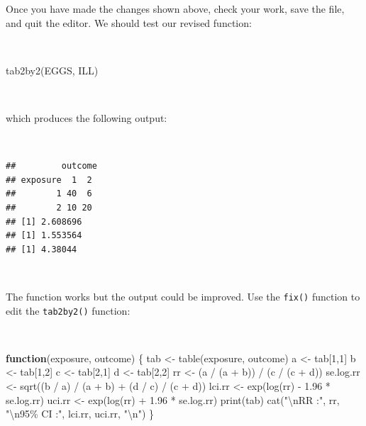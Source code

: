 \documentclass[
  12pt,
]{book}
\newenvironment{Shaded}{\begin{snugshade}}{\end{snugshade}}
\newcommand{\ControlFlowTok}[1]{\textcolor[rgb]{0.13,0.29,0.53}{\textbf{#1}}}
\newcommand{\DecValTok}[1]{\textcolor[rgb]{0.00,0.00,0.81}{#1}}
\newcommand{\FloatTok}[1]{\textcolor[rgb]{0.00,0.00,0.81}{#1}}
\newcommand{\FunctionTok}[1]{\textcolor[rgb]{0.00,0.00,0.00}{#1}}
\newcommand{\NormalTok}[1]{#1}
\newcommand{\OtherTok}[1]{\textcolor[rgb]{0.56,0.35,0.01}{#1}}
\newcommand{\SpecialCharTok}[1]{\textcolor[rgb]{0.00,0.00,0.00}{#1}}
\newcommand{\StringTok}[1]{\textcolor[rgb]{0.31,0.60,0.02}{#1}}
\begin{document}
Once you have made the changes shown above, check your work, save the file, and quit the editor. We should test our revised function:

~

\begin{Shaded}
\begin{Highlighting}[]
\FunctionTok{tab2by2}\NormalTok{(EGGS, ILL)}
\end{Highlighting}
\end{Shaded}

~

which produces the following output:

~

\begin{verbatim}
##         outcome
## exposure  1  2
##        1 40  6
##        2 10 20
## [1] 2.608696
## [1] 1.553564
## [1] 4.38044
\end{verbatim}

~

The function works but the output could be improved. Use the \texttt{fix()} function to edit the \texttt{tab2by2()} function:

~

\begin{Shaded}
\begin{Highlighting}[]
\ControlFlowTok{function}\NormalTok{(exposure, outcome) \{}
\NormalTok{  tab }\OtherTok{\textless{}{-}} \FunctionTok{table}\NormalTok{(exposure, outcome)}
\NormalTok{  a }\OtherTok{\textless{}{-}}\NormalTok{ tab[}\DecValTok{1}\NormalTok{,}\DecValTok{1}\NormalTok{]}
\NormalTok{  b }\OtherTok{\textless{}{-}}\NormalTok{ tab[}\DecValTok{1}\NormalTok{,}\DecValTok{2}\NormalTok{]}
\NormalTok{  c }\OtherTok{\textless{}{-}}\NormalTok{ tab[}\DecValTok{2}\NormalTok{,}\DecValTok{1}\NormalTok{]}
\NormalTok{  d }\OtherTok{\textless{}{-}}\NormalTok{ tab[}\DecValTok{2}\NormalTok{,}\DecValTok{2}\NormalTok{]}
\NormalTok{  rr }\OtherTok{\textless{}{-}}\NormalTok{ (a }\SpecialCharTok{/}\NormalTok{ (a }\SpecialCharTok{+}\NormalTok{ b)) }\SpecialCharTok{/}\NormalTok{ (c }\SpecialCharTok{/}\NormalTok{ (c }\SpecialCharTok{+}\NormalTok{ d))}
\NormalTok{  se.log.rr }\OtherTok{\textless{}{-}} \FunctionTok{sqrt}\NormalTok{((b }\SpecialCharTok{/}\NormalTok{ a) }\SpecialCharTok{/}\NormalTok{ (a }\SpecialCharTok{+}\NormalTok{ b) }\SpecialCharTok{+}\NormalTok{ (d }\SpecialCharTok{/}\NormalTok{ c) }\SpecialCharTok{/}\NormalTok{ (c }\SpecialCharTok{+}\NormalTok{ d)) }
\NormalTok{  lci.rr }\OtherTok{\textless{}{-}} \FunctionTok{exp}\NormalTok{(}\FunctionTok{log}\NormalTok{(rr) }\SpecialCharTok{{-}} \FloatTok{1.96} \SpecialCharTok{*}\NormalTok{ se.log.rr)}
\NormalTok{  uci.rr }\OtherTok{\textless{}{-}} \FunctionTok{exp}\NormalTok{(}\FunctionTok{log}\NormalTok{(rr) }\SpecialCharTok{+} \FloatTok{1.96} \SpecialCharTok{*}\NormalTok{ se.log.rr)}
  \FunctionTok{print}\NormalTok{(tab)}
  \FunctionTok{cat}\NormalTok{(}\StringTok{"}\SpecialCharTok{\textbackslash{}n}\StringTok{RR :"}\NormalTok{, rr,}
      \StringTok{"}\SpecialCharTok{\textbackslash{}n}\StringTok{95\% CI :"}\NormalTok{, lci.rr, uci.rr, }\StringTok{"}\SpecialCharTok{\textbackslash{}n}\StringTok{"}\NormalTok{)}
\NormalTok{\}}
\end{Highlighting}
\end{Shaded}
\end{document}
